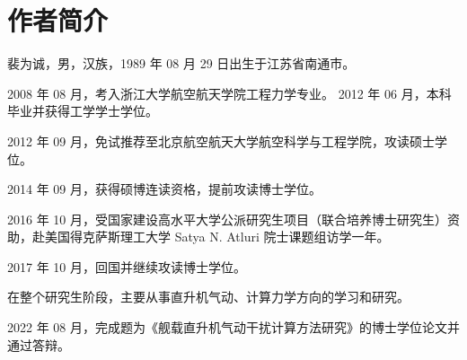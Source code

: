 \documentclass[doctor,openany,oneside,color,AutoFakeBold=true]{buaathesis}
\theoremstyle{plain}
\theoremstyle{plain}
\theoremstyle{plain}
\theoremstyle{plain}
\theoremstyle{plain}
\theoremstyle{plain}
\theoremstyle{plain}
\theoremstyle{plain}
\theoremstyle{plain}
\theoremstyle{plain}
\theoremstyle{plain}
\theoremstyle{plain}
\theoremstyle{definition}
\theoremstyle{definition}
\theoremstyle{definition}
\theoremstyle{definition}
\theoremstyle{definition}
\theoremstyle{definition}
\theoremstyle{remark}
\theoremstyle{remark}
\theoremstyle{remark}
\theoremstyle{remark}
\theoremstyle{remark}
\theoremstyle{problem}
\begin{document}
\maketitle
\pagestyle{frontmatter}


\makeatletter
\@openrightfalse
\makeatother

{}
\tableofcontents

\begingroup %

\renewcommand\citet[2][]{}
\renewcommand\cite[2][]{}
\renewcommand\upcite[2][]{}


\listoffigures

\listoftables

\endgroup %

\printnomenclature
\addEmptyPage

\makeatletter
\@openrighttrue
\makeatother

\mainmatter
\pagestyle{mainmatter}




\cleardoublepage
{}
{}

\clearpage

\appendix
% 

\backmatter




\chapter{作者简介}
裴为诚，男，汉族，1989 年 08 月 29 日出生于江苏省南通市。

2008 年 08 月，考入浙江大学航空航天学院工程力学专业。
2012 年 06 月，本科毕业并获得工学学士学位。

2012 年 09 月，免试推荐至北京航空航天大学航空科学与工程学院，攻读硕士学位。

2014 年 09 月，获得硕博连读资格，提前攻读博士学位。

2016 年 10 月，受国家建设高水平大学公派研究生项目（联合培养博士研究生）资助，赴美国得克萨斯理工大学 Satya N. Atluri 院士课题组访学一年。

2017 年 10 月，回国并继续攻读博士学位。

在整个研究生阶段，主要从事直升机气动、计算力学方向的学习和研究。

2022 年 08 月，完成题为《舰载直升机气动干扰计算方法研究》的博士学位论文并通过答辩。
\end{document}
